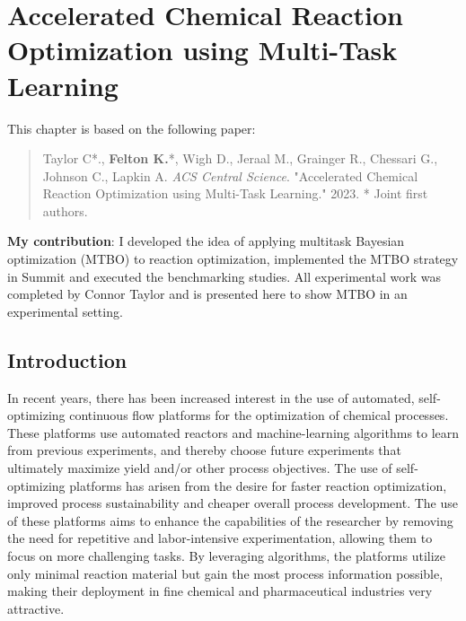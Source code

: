 \chapter{Accelerated Chemical Reaction Optimization using Multi-Task Learning}\label{ch:mtbo} 
This chapter is based on the following paper:

\begin{quote}
    Taylor C*., \textbf{Felton K.}*, Wigh D., Jeraal M., Grainger R., Chessari G., Johnson C., Lapkin A. \textit{ACS Central Science}. "Accelerated Chemical Reaction Optimization using Multi-Task Learning." 2023.
    * Joint first authors.
\end{quote}
\textbf{My contribution}: I developed  the idea of applying multitask Bayesian optimization (MTBO) to reaction optimization, implemented the MTBO strategy in Summit and executed the benchmarking studies. All experimental work was completed by Connor Taylor and is presented here to show MTBO in an experimental setting.

\section{Introduction}

In recent years, there has been increased interest in the use of automated, self-optimizing continuous flow platforms for the optimization of chemical processes.\cite{Reizman2016a, Fabry2016, Fitzpatrick2016, CortesBorda2016} These platforms use automated reactors and machine-learning algorithms to learn from previous experiments, and thereby choose future experiments that ultimately maximize yield and/or other process objectives. The use of self-optimizing platforms has arisen from the desire for faster reaction optimization, improved process sustainability and cheaper overall process development. The use of these platforms aims to enhance the capabilities of the researcher by removing the need for repetitive and labor-intensive experimentation, allowing them to focus on more challenging tasks. By leveraging algorithms, the platforms utilize only minimal reaction material but gain the most process information possible, making their deployment in fine chemical and pharmaceutical industries very attractive.\cite{Clayton2019, Clayton2020}

